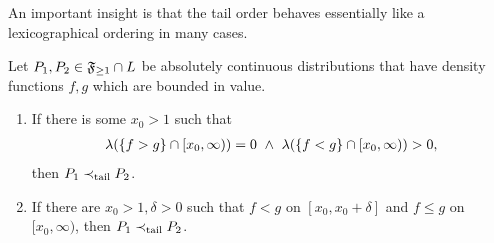 \documentclass[a4paper]{scrreprt}
\begin{document}
    An important insight is that the tail order behaves essentially like a lexicographical ordering in many cases.
    \begin{thm}
        Let $P_1, P_2 \in \mathfrak{F}_{\geq 1} \cap L$ be absolutely continuous distributions that have density functions $f, g$ which are bounded in value.
        \begin{enumerate}
            \item 
            If there is some $x_0 > 1$ such that 
            \begin{gather*}
                \lambda(\{f > g\} \cap [x_0, \infty)) = 0 ~\wedge~ \lambda(\{f < g\} \cap [x_0, \infty)) > 0,
            \end{gather*}
            then $P_1 \prec_{\text{tail}} P_2$.
            \label{item:acTailOrder-NonNullDominatingSetCondition}
            
            \item 
            If there are $x_0 > 1, \delta > 0$ such that $f < g$ on $[x_0, x_0 + \delta]$ and $f \leq g$ on $[x_0, \infty)$, then $P_1 \prec_{\text{tail}} P_2$.
            \label{item:acTailOrder-DominatingIntervalCondition}
        \end{enumerate}
    \end{thm}
\end{document}
